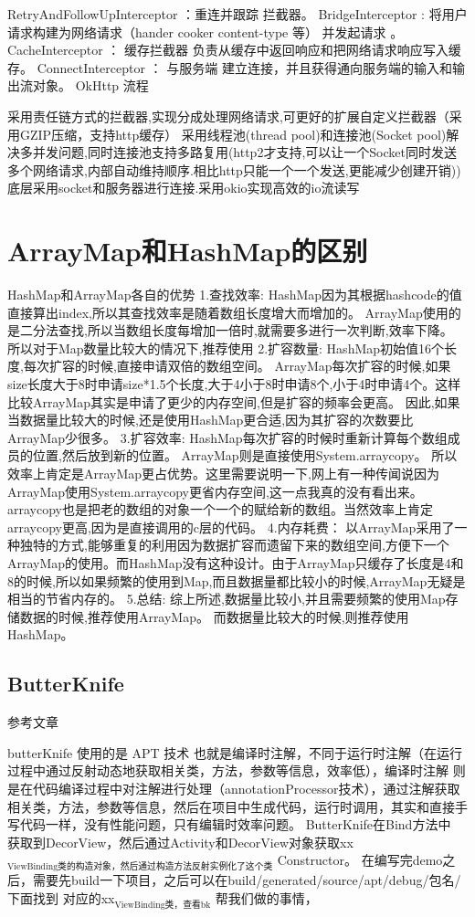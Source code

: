 \documentclass[9pt, b5paper]{article}
\begin{document}
RetryAndFollowUpInterceptor ：重连并跟踪 拦截器。
BridgeInterceptor : 将用户请求构建为网络请求（hander cooker content-type 等） 并发起请求 。
CacheInterceptor ： 缓存拦截器 负责从缓存中返回响应和把网络请求响应写入缓存。
ConnectInterceptor ： 与服务端 建立连接，并且获得通向服务端的输入和输出流对象。
OkHttp 流程

采用责任链方式的拦截器,实现分成处理网络请求,可更好的扩展自定义拦截器（采用GZIP压缩，支持http缓存）
采用线程池(thread pool)和连接池(Socket pool)解决多并发问题,同时连接池支持多路复用(http2才支持,可以让一个Socket同时发送多个网络请求,内部自动维持顺序.相比http只能一个一个发送,更能减少创建开销))
底层采用socket和服务器进行连接.采用okio实现高效的io流读写

\section{ArrayMap和HashMap的区别}
\label{sec-10}
HashMap和ArrayMap各自的优势
1.查找效率:
HashMap因为其根据hashcode的值直接算出index,所以其查找效率是随着数组长度增大而增加的。
ArrayMap使用的是二分法查找,所以当数组长度每增加一倍时,就需要多进行一次判断,效率下降。
所以对于Map数量比较大的情况下,推荐使用
2.扩容数量:
HashMap初始值16个长度,每次扩容的时候,直接申请双倍的数组空间。
ArrayMap每次扩容的时候,如果size长度大于8时申请size*1.5个长度,大于4小于8时申请8个,小于4时申请4个。这样比较ArrayMap其实是申请了更少的内存空间,但是扩容的频率会更高。
因此,如果当数据量比较大的时候,还是使用HashMap更合适,因为其扩容的次数要比ArrayMap少很多。
3.扩容效率:
HashMap每次扩容的时候时重新计算每个数组成员的位置,然后放到新的位置。
ArrayMap则是直接使用System.arraycopy。
所以效率上肯定是ArrayMap更占优势。这里需要说明一下,网上有一种传闻说因为ArrayMap使用System.arraycopy更省内存空间,这一点我真的没有看出来。arraycopy也是把老的数组的对象一个一个的赋给新的数组。当然效率上肯定arraycopy更高,因为是直接调用的c层的代码。
4.内存耗费：
以ArrayMap采用了一种独特的方式,能够重复的利用因为数据扩容而遗留下来的数组空间,方便下一个ArrayMap的使用。而HashMap没有这种设计。由于ArrayMap只缓存了长度是4和8的时候,所以如果频繁的使用到Map,而且数据量都比较小的时候,ArrayMap无疑是相当的节省内存的。
5.总结:
综上所述,数据量比较小,并且需要频繁的使用Map存储数据的时候,推荐使用ArrayMap。
而数据量比较大的时候,则推荐使用HashMap。

\subsection{ButterKnife}
\label{sec-10-1}
参考文章

butterKnife 使用的是 APT 技术 也就是编译时注解，不同于运行时注解（在运行过程中通过反射动态地获取相关类，方法，参数等信息，效率低），编译时注解 则是在代码编译过程中对注解进行处理（annotationProcessor技术），通过注解获取相关类，方法，参数等信息，然后在项目中生成代码，运行时调用，其实和直接手写代码一样，没有性能问题，只有编辑时效率问题。
ButterKnife在Bind方法中 获取到DecorView，然后通过Activity和DecorView对象获取xx$_{\text{ViewBinding类的构造对象，然后通过构造方法反射实例化了这个类}}$ Constructor。
在编写完demo之后，需要先build一下项目，之后可以在build/generated/source/apt/debug/包名/下面找到 对应的xx$_{\text{ViewBinding类，查看bk}}$ 帮我们做的事情，
\end{document}
